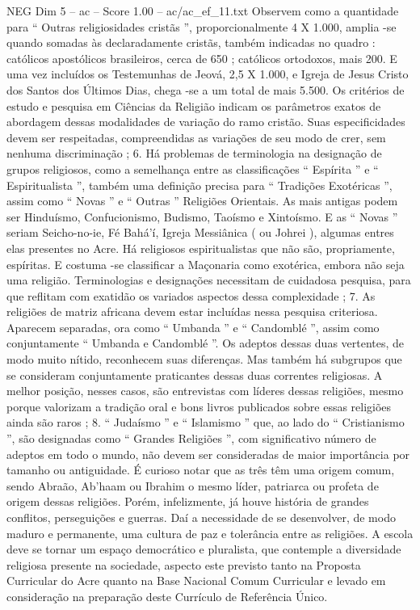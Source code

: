 \begin{textsample}{NEG Dim 5 – ac – Score 1.00 – ac/ac\_ef\_11.txt}
Observem como a quantidade para “ Outras religiosidades cristãs ”, proporcionalmente 4 X 1.000, amplia -se quando somadas às declaradamente cristãs, também indicadas no quadro : católicos apostólicos brasileiros, cerca de 650 ; católicos ortodoxos, mais 200.
E uma vez incluídos os Testemunhas de Jeová, 2,5 X 1.000, e Igreja de Jesus Cristo dos Santos dos Últimos Dias, chega -se a um total de mais 5.500.
Os critérios de estudo e pesquisa em Ciências da Religião indicam os parâmetros exatos de abordagem dessas modalidades de variação do ramo cristão.
Suas especificidades devem ser respeitadas, compreendidas as variações de seu modo de crer, sem nenhuma discriminação ; 6.
Há problemas de terminologia na designação de grupos religiosos, como a semelhança entre as classificações “ Espírita ” e “ Espiritualista ”, também uma definição precisa para “ Tradições Exotéricas ”, assim como “ Novas ” e “ Outras ” Religiões Orientais.
As mais antigas podem ser Hinduísmo, Confucionismo, Budismo, Taoísmo e Xintoísmo.
E as “ Novas ” seriam Seicho-no-ie, Fé Bahá’í, Igreja Messiânica ( ou Johrei ), algumas entres elas presentes no Acre.
Há religiosos espiritualistas que não são, propriamente, espíritas.
E costuma -se classificar a Maçonaria como exotérica, embora não seja uma religião.
Terminologias e designações necessitam de cuidadosa pesquisa, para que reflitam com exatidão os variados aspectos dessa complexidade ; 7.
As religiões de matriz africana devem estar incluídas nessa pesquisa criteriosa.
Aparecem separadas, ora como “ Umbanda ” e “ Candomblé ”, assim como conjuntamente “ Umbanda e Candomblé ”.
Os adeptos dessas duas vertentes, de modo muito nítido, reconhecem suas diferenças.
Mas também há subgrupos que se consideram conjuntamente praticantes dessas duas correntes religiosas.
A melhor posição, nesses casos, são entrevistas com líderes dessas religiões, mesmo porque valorizam a tradição oral e bons livros publicados sobre essas religiões ainda são raros ; 8. “ Judaísmo ” e “ Islamismo ” que, ao lado do “ Cristianismo ”, são designadas como “ Grandes Religiões ”, com significativo número de adeptos em todo o mundo, não devem ser consideradas de maior importância por tamanho ou antiguidade.
É curioso notar que as três têm uma origem comum, sendo Abraão, Ab’haam ou Ibrahim o mesmo líder, patriarca ou profeta de origem dessas religiões.
Porém, infelizmente, já houve história de grandes conflitos, perseguições e guerras.
Daí a necessidade de se desenvolver, de modo maduro e permanente, uma cultura de paz e tolerância entre as religiões.
A escola deve se tornar um espaço democrático e pluralista, que contemple a diversidade religiosa presente na sociedade, aspecto este previsto tanto na Proposta Curricular do Acre quanto na Base Nacional Comum Curricular e levado em consideração na preparação deste Currículo de Referência Único.

\end{textsample}
